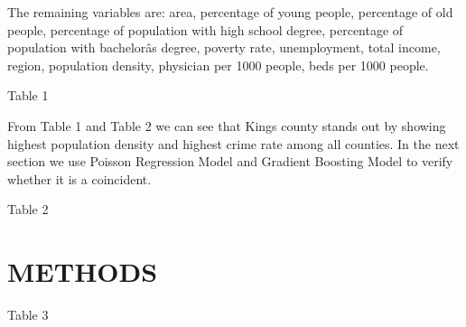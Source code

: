 \documentclass[preprint,12pt,3p]{elsarticle}
\begin{document}
The remaining variables are: area, percentage of young people, percentage of old people, percentage of population with high school degree, percentage of population with bachelorâs degree, poverty rate, unemployment, total income, region, population density, physician per 1000 people, beds per 1000 people.
\begin{center}
      \caption{Table 1}
\end{center}

From Table 1 and Table 2 we can see that Kings county stands out by showing highest population density and highest crime rate among all counties. In the next section we use Poisson Regression Model and Gradient Boosting Model to verify whether it is a coincident.
\begin{center}
    \caption{Table 2}
\end{center}


\section{METHODS}
\label{sec2}
\begin{center}
      \caption{Table 3}
\end{center}
\end{document}
